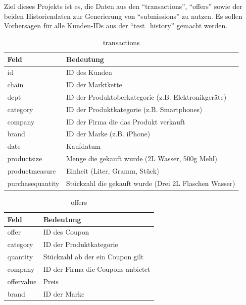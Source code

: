 Ziel dieses Projekts ist es, die Daten aus den "`transactions"', "`offers"' sowie der beiden Historiendaten zur Generierung von "`submissions"' zu nutzen. Es sollen Vorhersagen für alle Kunden-IDs aus der "`test\_history"' gemacht werden.

\begin{table}[h]
\centering
\begin{tabular}{l|l}
	 \textbf{Feld} & \textbf{Bedeutung}  \\ 
	\hline id & ID des Kunden \\ 
	\hline chain & ID der Marktkette \\ 
	\hline dept  & ID der Produktoberkategorie (z.B. Elektronikgeräte)  \\ 
	\hline category & ID der Produktkategorie (z.B. Smartphones) \\ 
	\hline company & ID der Firma die das Produkt verkauft \\ 
	\hline brand & ID der Marke (z.B. iPhone) \\ 
	\hline date & Kaufdatum \\
	\hline productsize & Menge die gekauft wurde (2L Wasser, 500g Mehl) \\ 	
	\hline productmeasure & Einheit (Liter, Gramm, Stück) \\ 	
	\hline purchasequantity & Stückzahl die gekauft wurde (Drei 2L Flaschen Wasser)
	\vspace{0.3cm} \\ 
\end{tabular}
\caption{transactions}
\label{tab:transactions}
\end{table}

\begin{table}[h]
\centering
\begin{tabular}{l|l}
	\textbf{Feld} & \textbf{Bedeutung}  \\ 
	\hline offer & ID des Coupon \\ 
	\hline category & ID der Produktkategorie \\ 
	\hline quantity & Stückzahl ab der ein Coupon gilt \\ 
	\hline company & ID der Firma die Coupons anbietet \\ 
	\hline offervalue & Preis \\ 
	\hline brand & ID der Marke
	\vspace{0.3cm} \\ 
\end{tabular}
\caption{offers}
\label{tab:offers}
\end{table}

